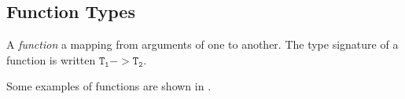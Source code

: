 \subsection{Function Types}\label{subsec:Function_Types}
\begin{definition}[Function]\label{def:Function}
  A \emph{function} a mapping from arguments of one  to another.
  The type signature of a function is written $\mathtt{T_{1}} -> \mathtt{T_{2}}$.

  Some examples of functions are shown in .

\end{definition}


